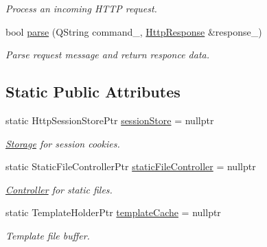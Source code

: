 \begin{DoxyCompactItemize}
\begin{DoxyCompactList}\small\item\em Process an incoming H\+T\+TP request. \end{DoxyCompactList}\item 
\mbox{\label{classeven_1_1_request_handler_a67e9d49f6832f8663e909a0666344764}} 
bool \mbox{\hyperlink{classeven_1_1_request_handler_a67e9d49f6832f8663e909a0666344764}{parse}} (Q\+String command\+\_\+, \mbox{\hyperlink{classstefanfrings_1_1_http_response}{Http\+Response}} \&response\+\_\+)
\begin{DoxyCompactList}\small\item\em Parse request message and return responce data. \end{DoxyCompactList}\end{DoxyCompactItemize}
\subsection*{Static Public Attributes}
\begin{DoxyCompactItemize}
\item 
\mbox{\label{classeven_1_1_request_handler_ae8b596775d9742535ef196c30c054216}} 
static Http\+Session\+Store\+Ptr \mbox{\hyperlink{classeven_1_1_request_handler_ae8b596775d9742535ef196c30c054216}{session\+Store}} = nullptr
\begin{DoxyCompactList}\small\item\em \mbox{\hyperlink{classeven_1_1_storage}{Storage}} for session cookies. \end{DoxyCompactList}\item 
\mbox{\label{classeven_1_1_request_handler_a98d03c832b4860f571a6cf7116c78dac}} 
static Static\+File\+Controller\+Ptr \mbox{\hyperlink{classeven_1_1_request_handler_a98d03c832b4860f571a6cf7116c78dac}{static\+File\+Controller}} = nullptr
\begin{DoxyCompactList}\small\item\em \mbox{\hyperlink{classeven_1_1_controller}{Controller}} for static files. \end{DoxyCompactList}\item 
static Template\+Holder\+Ptr \mbox{\hyperlink{classeven_1_1_request_handler_a9125480e85bb68d2e1a4eb14f411c80a}{template\+Cache}} = nullptr
\begin{DoxyCompactList}\small\item\em Template file buffer. \end{DoxyCompactList}\end{DoxyCompactItemize}


